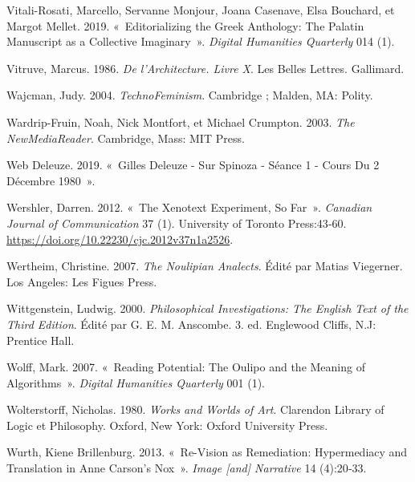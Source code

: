 \begin{CSLReferences}{1}{0}
\leavevmode{}%
Vitali-Rosati, Marcello, Servanne Monjour, Joana Casenave, Elsa
Bouchard, et Margot Mellet. 2019. {«~Editorializing the {Greek
Anthology}: {The Palatin Manuscript} as a {Collective Imaginary}~»}.
\emph{Digital Humanities Quarterly} 014 (1).

\leavevmode{}%
Vitruve, Marcus. 1986. \emph{{De l'Architecture. Livre X}}. Les Belles
Lettres. {Gallimard}.

\leavevmode{}%
Wajcman, Judy. 2004. \emph{{TechnoFeminism}}. {Cambridge ; Malden, MA}:
{Polity}.

\leavevmode{}%
Wardrip-Fruin, Noah, Nick Montfort, et Michael Crumpton. 2003. \emph{The
{NewMediaReader}}. {Cambridge, Mass}: {MIT Press}.

\leavevmode{}%
Web Deleuze. 2019. {«~Gilles {Deleuze} - {Sur Spinoza} - {S{é}ance} 1 -
{Cours} Du 2 D{é}cembre 1980~»}.

\leavevmode{}%
Wershler, Darren. 2012. {«~The {Xenotext Experiment}, {So Far}~»}.
\emph{Canadian Journal of Communication} 37 (1). {University of Toronto
Press}:43‑60. \url{https://doi.org/10.22230/cjc.2012v37n1a2526}.

\leavevmode{}%
Wertheim, Christine. 2007. \emph{The {Noulipian Analects}}. Édité par
Matias Viegerner. {Los Angeles}: {Les Figues Press}.

\leavevmode{}%
Wittgenstein, Ludwig. 2000. \emph{Philosophical {Investigations}: {The
English Text} of the {Third Edition}}. Édité par G. E. M. Anscombe. 3.
ed. {Englewood Cliffs, N.J}: {Prentice Hall}.

\leavevmode{}%
Wolff, Mark. 2007. {«~Reading {Potential}: {The Oulipo} and the
{Meaning} of {Algorithms}~»}. \emph{Digital Humanities Quarterly} 001
(1).

\leavevmode{}%
Wolterstorff, Nicholas. 1980. \emph{Works and {Worlds} of {Art}}.
Clarendon {Library} of {Logic} et {Philosophy}. {Oxford, New York}:
{Oxford University Press}.

\leavevmode{}%
Wurth, Kiene Brillenburg. 2013. {«~Re-{Vision} as {Remediation}:
{Hypermediacy} and {Translation} in {Anne Carson}'s {Nox}~»}.
\emph{Image {[}and{]} Narrative} 14 (4):20‑33.


\end{CSLReferences}
